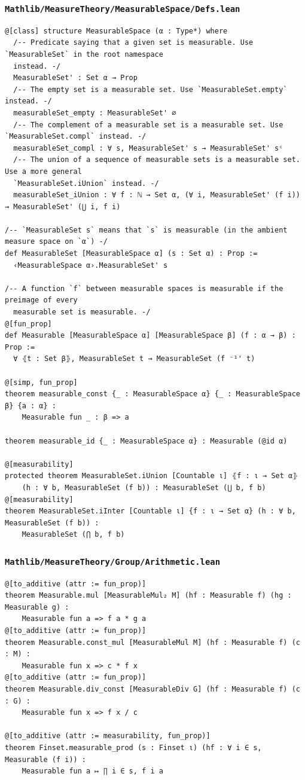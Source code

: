 \subsubsection{\texttt{Mathlib/MeasureTheory/MeasurableSpace/Defs.lean}}
\begin{lstlisting}[language=lean]
@[class] structure MeasurableSpace (α : Type*) where
  /-- Predicate saying that a given set is measurable. Use `MeasurableSet` in the root namespace
  instead. -/
  MeasurableSet' : Set α → Prop
  /-- The empty set is a measurable set. Use `MeasurableSet.empty` instead. -/
  measurableSet_empty : MeasurableSet' ∅
  /-- The complement of a measurable set is a measurable set. Use `MeasurableSet.compl` instead. -/
  measurableSet_compl : ∀ s, MeasurableSet' s → MeasurableSet' sᶜ
  /-- The union of a sequence of measurable sets is a measurable set. Use a more general
  `MeasurableSet.iUnion` instead. -/
  measurableSet_iUnion : ∀ f : ℕ → Set α, (∀ i, MeasurableSet' (f i)) → MeasurableSet' (⋃ i, f i)

/-- `MeasurableSet s` means that `s` is measurable (in the ambient measure space on `α`) -/
def MeasurableSet [MeasurableSpace α] (s : Set α) : Prop :=
  ‹MeasurableSpace α›.MeasurableSet' s

/-- A function `f` between measurable spaces is measurable if the preimage of every
  measurable set is measurable. -/
@[fun_prop]
def Measurable [MeasurableSpace α] [MeasurableSpace β] (f : α → β) : Prop :=
  ∀ ⦃t : Set β⦄, MeasurableSet t → MeasurableSet (f ⁻¹' t)

@[simp, fun_prop]
theorem measurable_const {_ : MeasurableSpace α} {_ : MeasurableSpace β} {a : α} :
    Measurable fun _ : β => a

theorem measurable_id {_ : MeasurableSpace α} : Measurable (@id α)

@[measurability]
protected theorem MeasurableSet.iUnion [Countable ι] ⦃f : ι → Set α⦄
    (h : ∀ b, MeasurableSet (f b)) : MeasurableSet (⋃ b, f b)
@[measurability]
theorem MeasurableSet.iInter [Countable ι] {f : ι → Set α} (h : ∀ b, MeasurableSet (f b)) :
    MeasurableSet (⋂ b, f b)
\end{lstlisting}

\subsubsection{\texttt{Mathlib/MeasureTheory/Group/Arithmetic.lean}}
\begin{lstlisting}[language=lean]
@[to_additive (attr := fun_prop)]
theorem Measurable.mul [MeasurableMul₂ M] (hf : Measurable f) (hg : Measurable g) :
    Measurable fun a => f a * g a
@[to_additive (attr := fun_prop)]
theorem Measurable.const_mul [MeasurableMul M] (hf : Measurable f) (c : M) :
    Measurable fun x => c * f x
@[to_additive (attr := fun_prop)]
theorem Measurable.div_const [MeasurableDiv G] (hf : Measurable f) (c : G) :
    Measurable fun x => f x / c

@[to_additive (attr := measurability, fun_prop)]
theorem Finset.measurable_prod (s : Finset ι) (hf : ∀ i ∈ s, Measurable (f i)) :
    Measurable fun a ↦ ∏ i ∈ s, f i a
\end{lstlisting}

